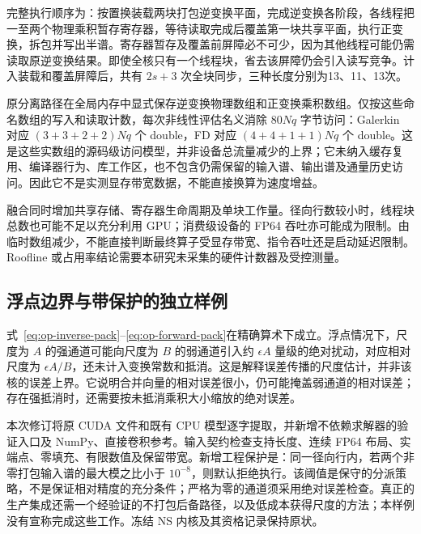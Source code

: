 完整执行顺序为：按置换装载两块打包逆变换平面，完成逆变换各阶段，各线程把一至两个物理乘积暂存寄存器，等待读取完成后覆盖第一块共享平面，执行正变换，拆包并写出半谱。寄存器暂存及覆盖前屏障必不可少，因为其他线程可能仍需读取原逆变换结果。即使全核只有一个线程块，省去该屏障仍会引入读写竞争。计入装载和覆盖屏障后，共有 \(2s+3\) 次全块同步，三种长度分别为13、11、13次。

原分离路径在全局内存中显式保存逆变换物理数组和正变换乘积数组。仅按这些命名数组的写入和读取计数，每次非线性评估名义消除 \(80Nq\) 字节访问：Galerkin 对应 \((3+3+2+2)Nq\) 个 double，FD 对应 \((4+4+1+1)Nq\) 个 double。这是这些实数组的源码级访问模型，并非设备总流量减少的上界；它未纳入缓存复用、编译器行为、库工作区，也不包含仍需保留的输入谱、输出谱及通量历史访问。因此它不是实测显存带宽数据，不能直接换算为速度增益。

融合同时增加共享存储、寄存器生命周期及单块工作量。径向行数较小时，线程块总数也可能不足以充分利用 GPU；消费级设备的 FP64 吞吐亦可能成为限制。由临时数组减少，不能直接判断最终算子受显存带宽、指令吞吐还是启动延迟限制。Roofline 或占用率结论需要本研究未采集的硬件计数器及受控测量。

\subsection{浮点边界与带保护的独立样例}

式~\eqref{eq:op-inverse-pack}--\eqref{eq:op-forward-pack}在精确算术下成立。浮点情况下，尺度为 \(A\) 的强通道可能向尺度为 \(B\) 的弱通道引入约 \(\epsilon A\) 量级的绝对扰动，对应相对尺度为 \(\epsilon A/B\)，还未计入变换常数和抵消。这是解释误差传播的尺度估计，并非该核的误差上界。它说明合并向量的相对误差很小，仍可能掩盖弱通道的相对误差；存在强抵消时，还需要按未抵消乘积大小缩放的绝对误差。

本次修订将原 CUDA 文件和既有 CPU 模型逐字提取，并新增不依赖求解器的验证入口及 NumPy、直接卷积参考。输入契约检查支持长度、连续 FP64 布局、实端点、零填充、有限数值及保留带宽。新增工程保护是：同一径向行内，若两个非零打包输入谱的最大模之比小于 \(10^{-8}\)，则默认拒绝执行。该阈值是保守的分派策略，不是保证相对精度的充分条件；严格为零的通道须采用绝对误差检查。真正的生产集成还需一个经验证的不打包后备路径，以及低成本获得尺度的方法；本样例没有宣称完成这些工作。冻结 NS 内核及其资格记录保持原状。

